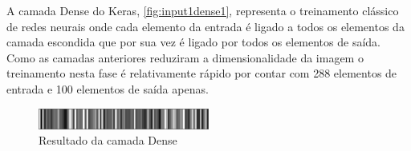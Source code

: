 \documentclass[
	12pt,				%
	oneside,			%
	a4paper,			%
	english,			%
	french,				%
	spanish,			%
	brazil,				%
	]{abntex2}
\begin{document}
\par A camada Dense do Keras, \autoref{fig:input1dense1}, representa o treinamento clássico de redes neurais onde cada elemento da entrada é ligado a todos os elementos da camada escondida que por sua vez é ligado por todos os elementos de saída. Como as camadas anteriores reduziram a dimensionalidade da imagem o treinamento nesta fase é relativamente rápido por contar com 288 elementos de entrada e 100 elementos de saída apenas.
\begin{center}
\begin{figure}[H]
	\centering
	\includegraphics[width=0.5\textwidth]{images/fabio/resultados/network_3/input_1_layer_dense_1}
	\caption{Resultado da camada Dense}
	\label{fig:input1dense1}
\end{figure}
\end{center}
\end{document}
